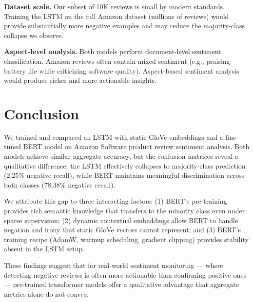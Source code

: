 \documentclass[11pt, a4paper]{article}
\begin{document}
\textbf{Dataset scale.} Our subset of 10K reviews is small by modern standards. Training the LSTM on the full Amazon dataset (millions of reviews) would provide substantially more negative examples and may reduce the majority-class collapse we observe.

\textbf{Aspect-level analysis.} Both models perform document-level sentiment classification. Amazon reviews often contain mixed sentiment (e.g., praising battery life while criticizing software quality). Aspect-based sentiment analysis \cite{sun2019utilizing} would produce richer and more actionable insights.

\section{Conclusion}

We trained and compared an LSTM with static GloVe embeddings and a fine-tuned BERT model on Amazon Software product review sentiment analysis. Both models achieve similar aggregate accuracy, but the confusion matrices reveal a qualitative difference: the LSTM effectively collapses to majority-class prediction (2.25\% negative recall), while BERT maintains meaningful discrimination across both classes (78.38\% negative recall).

We attribute this gap to three interacting factors: (1) BERT's pre-training provides rich semantic knowledge that transfers to the minority class even under sparse supervision; (2) dynamic contextual embeddings allow BERT to handle negation and irony that static GloVe vectors cannot represent; and (3) BERT's training recipe (AdamW, warmup scheduling, gradient clipping) provides stability absent in the LSTM setup.

These findings suggest that for real-world sentiment monitoring --- where detecting negative reviews is often more actionable than confirming positive ones --- pre-trained transformer models offer a qualitative advantage that aggregate metrics alone do not convey.
\end{document}

